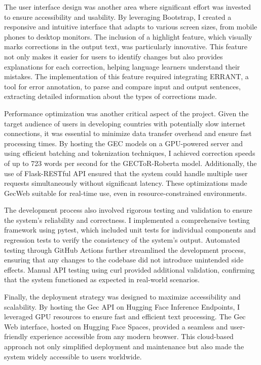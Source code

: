The user interface design was another area where significant effort was invested to ensure accessibility and usability.
By leveraging Bootstrap, I created a responsive and intuitive interface that adapts to various screen sizes, from mobile phones to desktop monitors.
The inclusion of a highlight feature, which visually marks corrections in the output text, was particularly innovative.
This feature not only makes it easier for users to identify changes but also provides explanations for each correction, helping language learners understand their mistakes.
The implementation of this feature required integrating ERRANT, a tool for error annotation, to parse and compare input and output sentences, extracting detailed information about the types of corrections made.

Performance optimization was another critical aspect of the project.
Given the target audience of users in developing countries with potentially slow internet connections, it was essential to minimize data transfer overhead and ensure fast processing times.
By hosting the GEC models on a GPU-powered server and using efficient batching and tokenization techniques, I achieved correction speeds of up to 723 words per second for the GECToR-Roberta model.
Additionally, the use of Flask-RESTful API ensured that the system could handle multiple user requests simultaneously without significant latency.
These optimizations made GecWeb suitable for real-time use, even in resource-constrained environments.

The development process also involved rigorous testing and validation to ensure the system's reliability and correctness.
I implemented a comprehensive testing framework using pytest, which included unit tests for individual components and regression tests to verify the consistency of the system's output.
Automated testing through GitHub Actions further streamlined the development process, ensuring that any changes to the codebase did not introduce unintended side effects.
Manual API testing using curl provided additional validation, confirming that the system functioned as expected in real-world scenarios.

Finally, the deployment strategy was designed to maximize accessibility and scalability.
By hosting the Gec API on Hugging Face Inference Endpoints, I leveraged GPU resources to ensure fast and efficient text processing.
The Gec Web interface, hosted on Hugging Face Spaces, provided a seamless and user-friendly experience accessible from any modern browser.
This cloud-based approach not only simplified deployment and maintenance but also made the system widely accessible to users worldwide.


